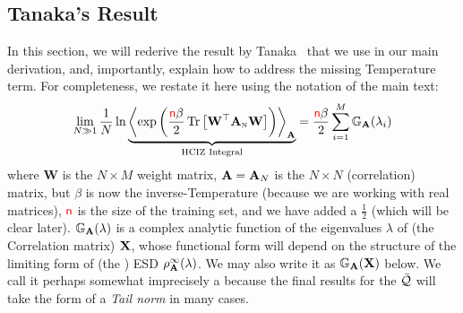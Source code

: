 \subsection{Tanaka's Result}
\label{sxn:tanaka}

In this section, we will rederive the result by Tanaka~\cite{Tanaka2007,Tanaka2008} that we use in our main derivation,
and, importantly, explain how to address the missing Temperature term.
For completeness, we restate it here using the notation of the main text:
\begin{equation}
  \label{eqn:hciz}
  \lim_{N \gg 1} \frac{1}{N} \ln 
\underbrace{
  \Expected[\mathbf{\AMAT}]{
    \exp\left(\frac{\ND\beta}{2}
    \Trace{\mathbf{W}^{\top} \AMATN \mathbf{W}}
    \right)
  }
 }_{\text{HCIZ Integral}}
  = \frac{\ND\beta}{2} \sum_{i=1}^{M} \GNORM(\lambda_{i})
\end{equation}
where 
$\mathbf{W}$ is the $N\times M$ \Teacher weight matrix, 
$\mathbf{A}=\mathbf{A}_N$ is the $N\times N$ \Student (correlation) matrix, 
but $\beta$ is now the inverse-Temperature (because we are working with real matrices), ${\color{red}\sf{n}}$ is the size of the training set, 
and we have added a $\tfrac{1}{2}$ (which will be clear later).
$\mathbb{G}_{\mathbf{A}}(\lambda)$ is a complex analytic function of the eigenvalues $\lambda$ of (the \Teacher Correlation matrix) $\mathbf{X}$, 
whose functional form will depend on the structure of the limiting form of (the \Student) ESD $\rho_{\mathbf{A}}^{\infty}(\lambda)$.
We may also write it as $\mathbb{G}_{\mathbf{A}}(\mathbf{X})$ below.
We call it perhaps somewhat imprecisely a  \emph{\GEN} because the final results for the \LayerQuality  $\bar{\mathcal{Q}}$ will take the form of a \emph{Tail norm} in many cases.


